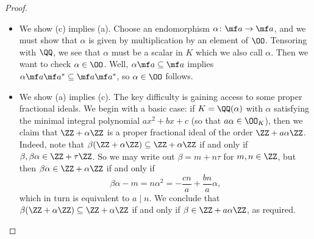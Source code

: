 \documentclass[../notes.tex]{subfiles}
\begin{document}
\begin{proof}
\begin{itemize}
		\item We show (c) implies (a). Choose an endomorphism $\alpha\colon\mf a\to\mf a$, and we must show that $\alpha$ is given by multiplication by an element of $\OO$. Tensoring with $\QQ$, we see that $\alpha$ must be a scalar in $K$ which we also call $\alpha$. Then we want to check $\alpha\in\OO$. Well, $\alpha\mf a\subseteq\mf a$ implies $\alpha\mf a\mf a^*\subseteq\mf a\mf a^*$, so $\alpha\in\OO$ follows.


		\item We show (a) implies (c). The key difficulty is gaining access to some proper fractional ideals. We begin with a basic case: if $K=\QQ(\alpha)$ with $\alpha$ satisfying the minimal integral polynomial $ax^2+bx+c$ (so that $a\alpha\in\OO_K$), then we claim that $\ZZ+\alpha\ZZ$ is a proper fractional ideal of the order $\ZZ+a\alpha\ZZ$. Indeed, note that $\beta(\ZZ+\alpha\ZZ)\subseteq\ZZ+\alpha\ZZ$ if and only if $\beta,\beta\alpha\in\ZZ+\tau\ZZ$. So we may write out $\beta=m+n\tau$ for $m,n\in\ZZ$, but then $\beta\alpha\in\ZZ+\alpha\ZZ$ if and only if
		\[\beta\alpha-m=n\alpha^2=-\frac{cn}a+\frac{bn}a\alpha,\]
		which in turn is equivalent to $a\mid n$. We conclude that $\beta(\ZZ+\alpha\ZZ)\subseteq\ZZ+\alpha\ZZ$ if and only if $\beta\in\ZZ+a\alpha\ZZ$, as required.
		

\end{itemize}
\end{proof}
\end{document}
